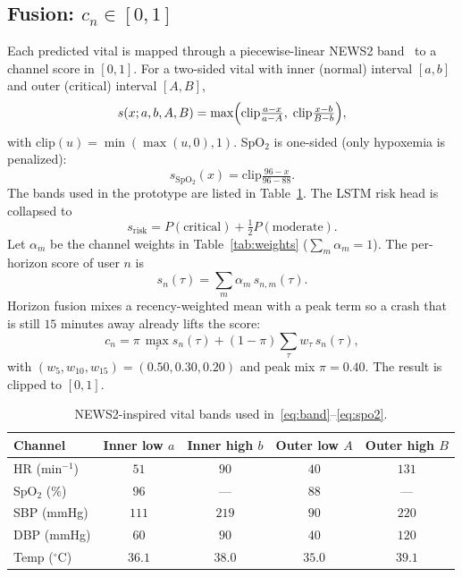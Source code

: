 \documentclass[journal,a4paper,10pt]{IEEEtran}
\begin{document}
\subsection{Fusion: \(c_n\in[0,1]\)}
\label{sec:fusion}
Each predicted vital is mapped through a piecewise-linear NEWS2 band~\cite{royal2017news2} to a channel score in \([0,1]\). For a two-sided vital with inner (normal) interval \([a,b]\) and outer (critical) interval \([A,B]\),
\begin{equation}
  s(x;a,b,A,B)
  =
  \max\Bigl(
    \mathrm{clip}\tfrac{a-x}{a-A},\;
    \mathrm{clip}\tfrac{x-b}{B-b}
  \Bigr),
  \label{eq:band}
\end{equation}
with \(\mathrm{clip}(u)=\min(\max(u,0),1)\). SpO\(_2\) is one-sided (only hypoxemia is penalized):
\begin{equation}
  s_{\mathrm{SpO_2}}(x)=\mathrm{clip}\tfrac{96-x}{96-88}.
  \label{eq:spo2}
\end{equation}
The bands used in the prototype are listed in Table~\ref{tab:bands}. The LSTM risk head is collapsed to
\begin{equation}
  s_{\mathrm{risk}}
  = P(\mathrm{critical})+\tfrac12 P(\mathrm{moderate}).
  \label{eq:risk-head}
\end{equation}
Let \(\alpha_m\) be the channel weights in Table~\ref{tab:weights} (\(\sum_m\alpha_m=1\)). The per-horizon score of user \(n\) is
\begin{equation}
  s_n(\tau)
  =\sum_{m}\alpha_m\,s_{n,m}(\tau).
  \label{eq:channel-fuse}
\end{equation}
Horizon fusion mixes a recency-weighted mean with a peak term so a crash that is still \(15\) minutes away already lifts the score:
\begin{equation}
  c_n
  =
  \pi\,\max_{\tau}s_n(\tau)
  +(1-\pi)\sum_{\tau}w_{\tau}\,s_n(\tau),
  \label{eq:cn}
\end{equation}
with \((w_{5},w_{10},w_{15})=(0.50,0.30,0.20)\) and peak mix \(\pi=0.40\). The result is clipped to \([0,1]\).

\begin{table}[!t]
\caption{NEWS2-inspired vital bands used in~\eqref{eq:band}--\eqref{eq:spo2}.}
\label{tab:bands}
\centering
\begin{tabular}{@{}lcccc@{}}
\toprule
Channel & Inner low \(a\) & Inner high \(b\) & Outer low \(A\) & Outer high \(B\) \\
\midrule
HR (min\(^{-1}\)) & \(51\) & \(90\) & \(40\) & \(131\) \\
SpO\(_2\) (\%) & \(96\) & --- & \(88\) & --- \\
SBP (mmHg) & \(111\) & \(219\) & \(90\) & \(220\) \\
DBP (mmHg) & \(60\) & \(90\) & \(40\) & \(120\) \\
Temp (\(^\circ\)C) & \(36.1\) & \(38.0\) & \(35.0\) & \(39.1\) \\
\bottomrule
\end{tabular}
\end{table}
\end{document}
